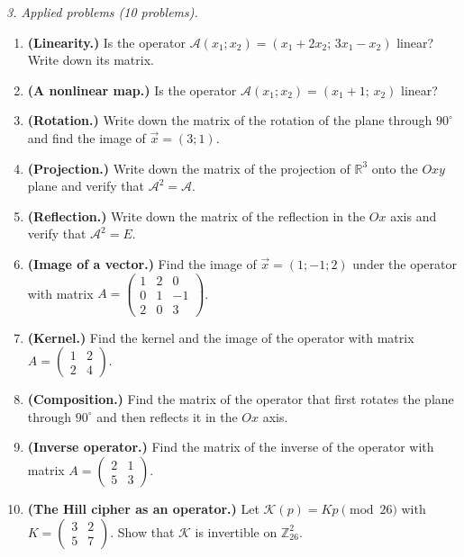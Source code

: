 \emph{3. Applied problems (10 problems).}
\bigskip
\begin{enumerate}[label=\arabic*., leftmargin=*]
\item \textbf{(Linearity.)} Is the operator $\mathcal A(x_1;x_2)=(x_1+2x_2;\,3x_1-x_2)$ linear? Write down its matrix.
\item \textbf{(A nonlinear map.)} Is the operator $\mathcal A(x_1;x_2)=(x_1+1;\,x_2)$ linear?
\item \textbf{(Rotation.)} Write down the matrix of the rotation of the plane through $90^\circ$ and find the image of $\vec x=(3;1)$.
\item \textbf{(Projection.)} Write down the matrix of the projection of $\mathbb R^3$ onto the $Oxy$ plane and verify that $\mathcal A^2=\mathcal A$.
\item \textbf{(Reflection.)} Write down the matrix of the reflection in the $Ox$ axis and verify that $\mathcal A^2=E$.
\item \textbf{(Image of a vector.)} Find the image of $\vec x=(1;-1;2)$ under the operator with matrix $A=\left(\begin{smallmatrix}1&2&0\\0&1&-1\\2&0&3\end{smallmatrix}\right)$.
\item \textbf{(Kernel.)} Find the kernel and the image of the operator with matrix $A=\left(\begin{smallmatrix}1&2\\2&4\end{smallmatrix}\right)$.
\item \textbf{(Composition.)} Find the matrix of the operator that first rotates the plane through $90^\circ$ and then reflects it in the $Ox$ axis.
\item \textbf{(Inverse operator.)} Find the matrix of the inverse of the operator with matrix $A=\left(\begin{smallmatrix}2&1\\5&3\end{smallmatrix}\right)$.
\item \textbf{(The Hill cipher as an operator.)} Let $\mathcal K(p)=Kp\pmod{26}$ with $K=\left(\begin{smallmatrix}3&2\\5&7\end{smallmatrix}\right)$. Show that $\mathcal K$ is invertible on $\mathbb Z_{26}^2$.
\end{enumerate}

